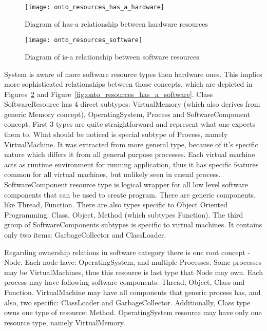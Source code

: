 \begin{figure}[ht]
  \centering
  \texttt{[image: onto\_resources\_has\_a\_hardware]}
  \caption{Diagram of has-a relationship between hardware resources}
  \label{fig:onto_resources_has_a_hardware}
\end{figure}


\begin{figure}[ht]
  \centering
  \texttt{[image: onto\_resources\_software]}
  \caption{Diagram of is-a relationship between software resources}
  \label{fig:onto_resources_software}
\end{figure}

System is aware of more software resource types then hardware ones. This implies more sophisticated relationships
between those concepts, which are depicted in Figures~\ref{fig:onto_resources_software} and
Figure~\ref{fig:onto_resources_has_a_software}. Class SoftwareResource has 4 direct subtypes: VirtualMemory (which
also derives from generic Memory concept), OperatingSystem, Process and SoftwareComponent concept. First 3 types are
quite straightforward and represent what one expects them to.
What should be noticed is special subtype of Process, namely VirtualMachine. It was extracted from more
general type, because of it's specific nature which differs it from all general purpose processes. Each virtual
machine acts as runtime environment for running application, thus it has specific features common for all virtual
machines, but unlikely seen in casual process.
SoftwareComponent resource type is logical wrapper for all low level software components that can be used to create
program. There are generic components, like Thread, Function. There are also types specific to Object Oriented
Programming: Class, Object, Method (which subtypes Function). The third group of SoftwareComponents subtypes is specific
to virtual machines. It contains only two items: GarbageCollector and ClassLoader.

Regarding ownership relations in software category there is one root concept - Node. Each node have: OperatingSystem,
and multiple Processes. Some processes may be VirtualMachines, thus this resource is last type that Node may own.
Each process may have following software components: Thread, Object, Class and Function. VirtualMachine may have
all components that generic process has, and also, two specific: ClassLoader and GarbageCollector. Additionally, Class
type owns one type of resource: Method. 
OperatingSystem resource may have only one resource type, namely VirtualMemory.


